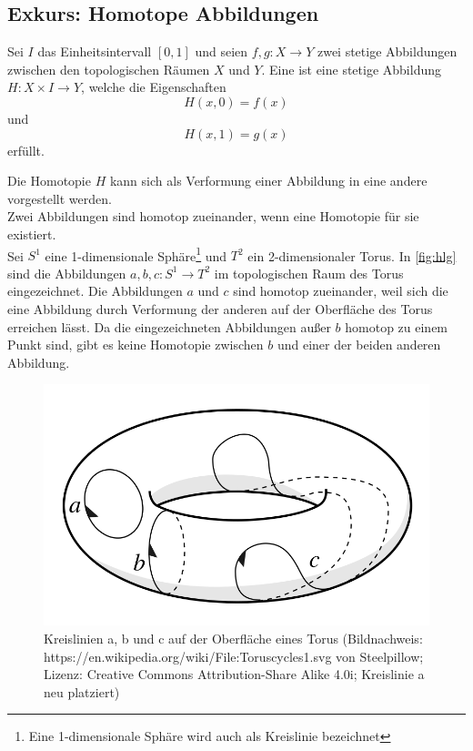 \subsection{Exkurs: Homotope Abbildungen}
\begin{df}
Sei $I$ das Einheitsintervall $[0, 1]$ und seien $f, g: X \rightarrow Y$ zwei stetige Abbildungen zwischen den topologischen Räumen $X$ und $Y$. Eine  ist eine stetige Abbildung $H : X \times I \rightarrow Y$, welche die Eigenschaften
\begin{equation}
H(x, 0) = f(x)
\end{equation}
und
\begin{equation}
H(x, 1) = g(x)
\end{equation}
erfüllt.
\end{df}
Die Homotopie $H$ kann sich als Verformung einer Abbildung in eine andere vorgestellt werden.\\
Zwei Abbildungen sind homotop zueinander, wenn eine Homotopie für sie existiert.\\
 Sei $S^1$ eine 1-dimensionale Sphäre\footnote{Eine 1-dimensionale Sphäre wird auch als Kreislinie bezeichnet} und $T^2$ ein 2-dimensionaler Torus. In \autoref{fig:hlg} sind die Abbildungen $a, b, c: S^1 \rightarrow T^2$ im topologischen Raum des Torus eingezeichnet. Die Abbildungen $a$ und $c$ sind homotop zueinander, weil sich die eine Abbildung durch Verformung der anderen auf der Oberfläche des Torus erreichen lässt. Da die eingezeichneten Abbildungen außer $b$ homotop zu einem Punkt sind, gibt es keine Homotopie zwischen $b$ und einer der beiden anderen Abbildung.

\begin{figure}[!h]
\includegraphics[scale=0.67]{img/Torus}
%
\caption{Kreislinien a, b und c auf der Oberfläche eines Torus (Bildnachweis: https://en.wikipedia.org/wiki/File:Toruscycles1.svg von Steelpillow; Lizenz: Creative Commons Attribution-Share Alike 4.0i; Kreislinie a neu platziert)}\label{fig:hlg}
\end{figure}

